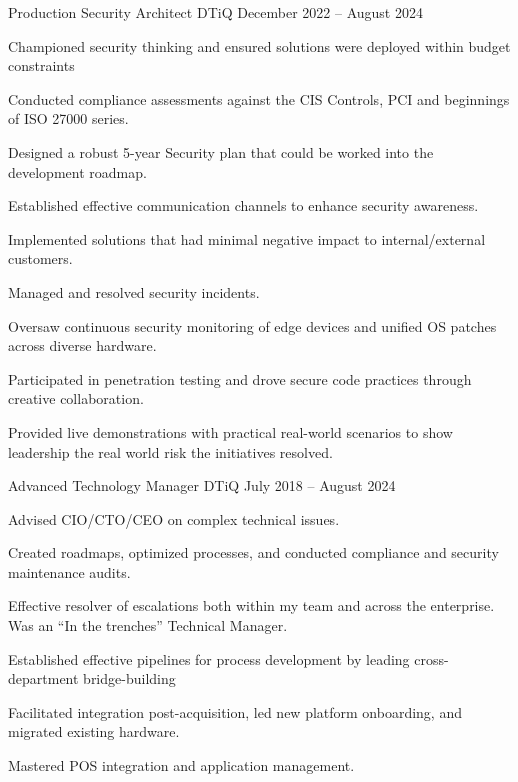 \documentclass[]{resume-format}
\begin{document}
\begin{cventries}
    \cventry
    { Production Security Architect }
    { DTiQ }
    {}
    { December 2022 – August 2024 }
    {\begin{cvitems}
        \item { Championed security thinking and ensured solutions were deployed within budget constraints }
        \item { Conducted compliance assessments against the CIS Controls, PCI and beginnings of ISO 27000 series. }
        \item { Designed a robust 5-year Security plan that could be worked into the development roadmap. }
        \item { Established effective communication channels to enhance security awareness. }
        \item { Implemented solutions that had minimal negative impact to internal/external customers. }
        \item { Managed and resolved security incidents. }
        \item { Oversaw continuous security monitoring of edge devices and unified OS patches across diverse hardware. }
        \item { Participated in penetration testing and drove secure code practices through creative collaboration. }
        \item { Provided live demonstrations with practical real-world scenarios to show leadership the real world risk the initiatives resolved. }
    \end{cvitems}}
    \cventry
    { Advanced Technology Manager }
    { DTiQ }
    {}
    { July 2018 – August 2024 }
    {\begin{cvitems}
        \item { Advised CIO/CTO/CEO on complex technical issues. }
        \item { Created roadmaps, optimized processes, and conducted compliance and security maintenance audits. }
        \item { Effective resolver of escalations both within my team and across the enterprise. Was an “In the trenches” Technical Manager. }
        \item { Established effective pipelines for process development by leading cross-department bridge-building }
        \item { Facilitated integration post-acquisition, led new platform onboarding, and migrated existing hardware. }
        \item { Mastered POS integration and application management. }

\end{cvitems}}
\end{cventries}
\end{document}
